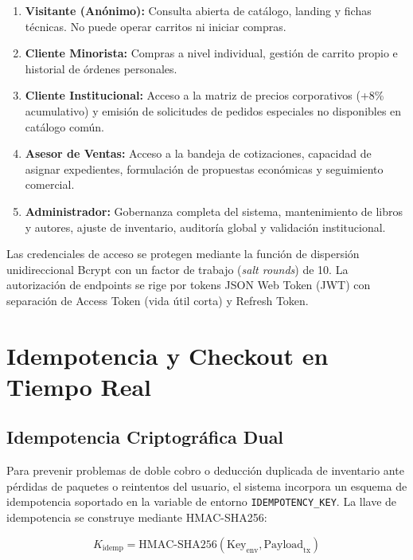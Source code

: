 \documentclass[conference]{IEEEtran}
\begin{document}
\begin{enumerate}
    \item \textbf{Visitante (Anónimo):} Consulta abierta de catálogo, landing y fichas técnicas. No puede operar carritos ni iniciar compras.
    \item \textbf{Cliente Minorista:} Compras a nivel individual, gestión de carrito propio e historial de órdenes personales.
    \item \textbf{Cliente Institucional:} Acceso a la matriz de precios corporativos (+8\% acumulativo) y emisión de solicitudes de pedidos especiales no disponibles en catálogo común.
    \item \textbf{Asesor de Ventas:} Acceso a la bandeja de cotizaciones, capacidad de asignar expedientes, formulación de propuestas económicas y seguimiento comercial.
    \item \textbf{Administrador:} Gobernanza completa del sistema, mantenimiento de libros y autores, ajuste de inventario, auditoría global y validación institucional.
\end{enumerate}

Las credenciales de acceso se protegen mediante la función de dispersión unidireccional Bcrypt con un factor de trabajo (\textit{salt rounds}) de 10. La autorización de endpoints se rige por tokens JSON Web Token (JWT) con separación de Access Token (vida útil corta) y Refresh Token.

\section{Idempotencia y Checkout en Tiempo Real}

\subsection{Idempotencia Criptográfica Dual}
Para prevenir problemas de doble cobro o deducción duplicada de inventario ante pérdidas de paquetes o reintentos del usuario, el sistema incorpora un esquema de idempotencia soportado en la variable de entorno \texttt{IDEMPOTENCY\_KEY}. La llave de idempotencia se construye mediante HMAC-SHA256:

\begin{equation}
K_{\text{idemp}} = \text{HMAC-SHA256}(\text{Key}_{\text{env}}, \text{Payload}_{\text{tx}})
\end{equation}
\end{document}
